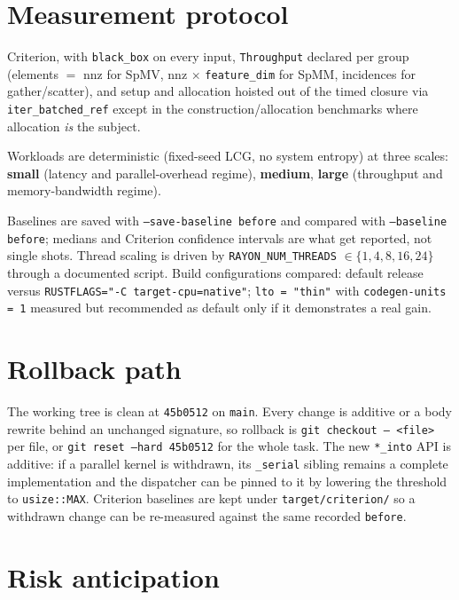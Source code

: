 \documentclass[11pt,a4paper]{article}
\begin{document}
\section{Measurement protocol}

Criterion, with \texttt{black\_box} on every input, \texttt{Throughput}
declared per group (elements $=$ nnz for SpMV, nnz $\times$
\texttt{feature\_dim} for SpMM, incidences for gather/scatter), and setup
and allocation hoisted out of the timed closure via
\texttt{iter\_batched\_ref} except in the construction/allocation benchmarks
where allocation \emph{is} the subject.

Workloads are deterministic (fixed-seed LCG, no system entropy) at three
scales: \textbf{small} (latency and parallel-overhead regime),
\textbf{medium}, \textbf{large} (throughput and memory-bandwidth regime).

Baselines are saved with \texttt{--save-baseline before} and compared with
\texttt{--baseline before}; medians and Criterion confidence intervals are
what get reported, not single shots. Thread scaling is driven by
\texttt{RAYON\_NUM\_THREADS} $\in \{1,4,8,16,24\}$ through a documented
script. Build configurations compared: default release versus
\texttt{RUSTFLAGS="-C target-cpu=native"}; \texttt{lto = "thin"} with
\texttt{codegen-units = 1} measured but recommended as default only if it
demonstrates a real gain.

\section{Rollback path}

The working tree is clean at \texttt{45b0512} on \texttt{main}. Every change
is additive or a body rewrite behind an unchanged signature, so rollback is
\texttt{git checkout -- <file>} per file, or \texttt{git reset --hard
45b0512} for the whole task. The new \texttt{*\_into} API is additive: if a
parallel kernel is withdrawn, its \texttt{\_serial} sibling remains a
complete implementation and the dispatcher can be pinned to it by lowering
the threshold to \texttt{usize::MAX}. Criterion baselines are kept under
\texttt{target/criterion/} so a withdrawn change can be re-measured against
the same recorded \texttt{before}.

\section{Risk anticipation}
\end{document}

